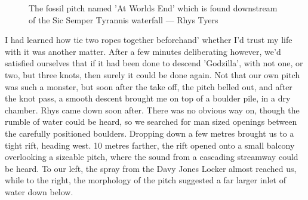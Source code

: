     \begin{figure}[h]
        \checkoddpage \ifoddpage \forcerectofloat \else \forceversofloat \fi
        \centering
        
        \caption{The fossil pitch named 'At Worlds End' which is found downstream of the Sic Semper Tyrannis waterfall --- Rhys Tyers}
        \label{water chamber below helm's deep}
    \end{figure}

    I had learned how tie two ropes together beforehand' whether I'd trust my life with it was another matter. After a few minutes deliberating however, we'd satisfied ourselves that if it had been done to descend 'Godzilla', with not one, or two, but three knots, then surely it could be done again. Not that our own pitch was such a monster, but soon after the take off, the pitch belled out, and after the knot pass, a smooth descent brought me on top of a boulder pile, in a dry chamber. Rhys came down soon after. There was no obvious way on, though the rumble of water could be heard, so we searched for man sized openings between the carefully positioned boulders. Dropping down a few metres brought us to a tight rift, heading west. 10 metres farther, the rift opened onto a small balcony overlooking a sizeable pitch, where the sound from a cascading streamway could be heard. To our left, the spray from the Davy Jones Locker almost reached us, while to the right, the morphology of the pitch suggested a far larger inlet of water down below. 

